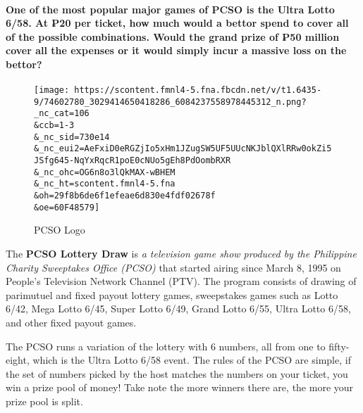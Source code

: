 \documentclass[
]{article}
\begin{document}
\hypertarget{one-of-the-most-popular-major-games-of-pcso-is-the-ultra-lotto-658.-at-20-per-ticket-how-much-would-a-bettor-spend-to-cover-all-of-the-possible-combinations.-would-the-grand-prize-of-50-million-cover-all-the-expenses-or-it-would-simply-incur-a-massive-loss-on-the-bettor}{%
\paragraph{\texorpdfstring{ One of the most popular major games of PCSO
is the Ultra Lotto 6/58. At ₱20 per ticket, how much would a bettor
spend to cover all of the possible combinations. Would the grand prize
of ₱50 million cover all the expenses or it would simply incur a massive
loss on the
bettor?}{ One of the most popular major games of PCSO is the Ultra Lotto 6/58. At ₱20 per ticket, how much would a bettor spend to cover all of the possible combinations. Would the grand prize of ₱50 million cover all the expenses or it would simply incur a massive loss on the bettor?}}\label{one-of-the-most-popular-major-games-of-pcso-is-the-ultra-lotto-658.-at-20-per-ticket-how-much-would-a-bettor-spend-to-cover-all-of-the-possible-combinations.-would-the-grand-prize-of-50-million-cover-all-the-expenses-or-it-would-simply-incur-a-massive-loss-on-the-bettor}}

\begin{figure}
\centering
\texttt{[image: https://scontent.fmnl4-5.fna.fbcdn.net/v/t1.6435-9/74602780\_3029414650418286\_6084237558978445312\_n.png?\_nc\_cat=106\\\&ccb=1-3\\\&\_nc\_sid=730e14\\\&\_nc\_eui2=AeFxiD0eRGZjIo5xHm1JZugSW5UF5UUcNKJblQXlRRw0okZi5JSfg645-NqYxRqcR1poE0cNUo5gEh8PdOombRXR\\\&\_nc\_ohc=OG6n8o3lQkMAX-wBHEM\\\&\_nc\_ht=scontent.fmnl4-5.fna\\\&oh=29f8b6de6f1efeae6d830e4fdf02678f\\\&oe=60F48579]}
\caption{PCSO Logo}
\end{figure}

The \textbf{PCSO Lottery Draw} is \emph{a television game show produced
by the Philippine Charity Sweeptakes Office (PCSO)} that started airing
since March 8, 1995 on People's Television Network Channel (PTV). The
program consists of drawing of parimutuel and fixed payout lottery
games, sweepstakes games such as Lotto 6/42, Mega Lotto 6/45, Super
Lotto 6/49, Grand Lotto 6/55, Ultra Lotto 6/58, and other fixed payout
games.

The PCSO runs a variation of the lottery with 6 numbers, all from one to
fifty-eight, which is the Ultra Lotto 6/58 event. The rules of the PCSO
are simple, if the set of numbers picked by the host matches the numbers
on your ticket, you win a prize pool of money! Take note the more
winners there are, the more your prize pool is split.
\end{document}
